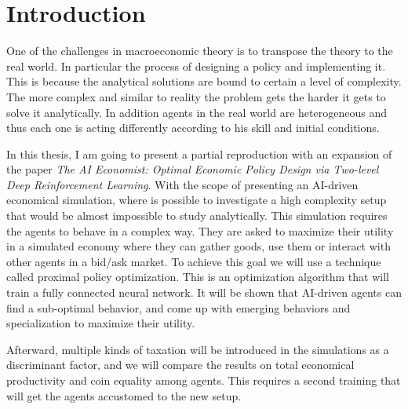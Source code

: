 \documentclass[12pt,a4paper,openright]{report}
\numberwithin{equation}{section}
\begin{document}
\clearpage{\pagestyle{empty}\cleardoublepage}
\tableofcontents      
\clearpage{\pagestyle{empty}\cleardoublepage}

\begingroup
\let\clearpage\relax
\listoffigures   
\listoftables  
\listofalgorithms
\endgroup

\clearpage{\pagestyle{empty}\cleardoublepage}

\chapter*{Introduction}             

One of the challenges in macroeconomic theory is to transpose the theory to the real world. In particular the process of designing a policy and implementing it. This is because the analytical solutions are bound to certain a level of complexity. The more complex and similar to reality the problem gets the harder it gets to solve it analytically. In addition agents in the real world are heterogeneous and thus each one is acting differently according to his skill and initial conditions. 

In this thesis, I am going to present a partial reproduction with an expansion of the paper \textit{The AI Economist: Optimal Economic Policy Design via Two-level Deep Reinforcement Learning}\cite{zheng2021ai}. With the scope of presenting an AI-driven economical simulation, where is possible to investigate a high complexity setup that would be almost impossible to study analytically. This simulation requires the agents to behave in a complex way. They are asked to maximize their utility in a simulated economy where they can gather goods, use them or interact with other agents in a bid/ask market. To achieve this goal we will use a technique called proximal policy optimization. This is an optimization algorithm that will train a fully connected neural network. It will be shown that AI-driven agents can find a sub-optimal behavior, and come up with emerging behaviors and specialization to maximize their utility.

Afterward, multiple kinds of taxation will be introduced in the simulations as a discriminant factor, and we will compare the results on total economical productivity and coin equality among agents. This requires a second training that will get the agents accustomed to the new setup. 
\end{document}
